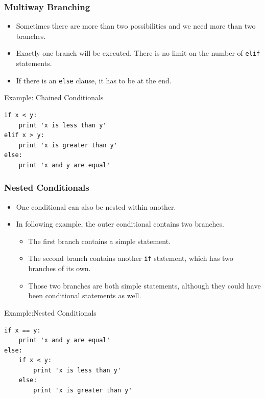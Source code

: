 \documentclass{beamer}
\begin{document}
\begin{frame}[fragile]
\frametitle{Multiway Branching}
\begin{itemize}
\item Sometimes there are more than two possibilities and we need more than
two branches.  
\item	Exactly one branch will be executed.  There is no limit on the number of \texttt{elif} statements. 
\item If there is an \texttt{else} clause, it has to be
at the \alert{end}.
\end{itemize}

\begin{block}{Example: Chained Conditionals} 
\tiny
\begin{verbatim}
if x < y:
    print 'x is less than y'
elif x > y:
    print 'x is greater than y'
else:
    print 'x and y are equal'
\end{verbatim}
\end{block}
\end{frame}



\begin{frame}[fragile]
\frametitle{Nested Conditionals}
\begin{itemize}
\item One conditional can also be \alert{nested} within another. 
\item In following example, the outer conditional contains two branches.  
\begin{itemize}[<+->]
\item The
first branch contains a simple statement.  
\item The second branch
contains another {\tt if} statement, which has \alert{two branches} of its
own.  
\item Those two branches are both simple statements,
although they could have been conditional statements as well.
\end{itemize}
\end{itemize}

\begin{block}{Example:Nested Conditionals} 
\tiny
\begin{verbatim}
if x == y:
    print 'x and y are equal'
else:
    if x < y:
        print 'x is less than y'
    else:
        print 'x is greater than y'
\end{verbatim}
\end{block}

\end{frame}
\end{document}
